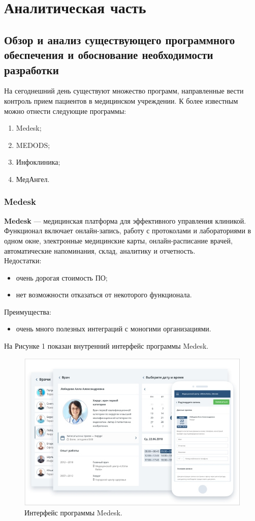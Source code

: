 \documentclass[a4paper, 10pt]{article}
\begin{document}
\clearpage
\newpage
\section{Аналитическая часть}
	\subsection{Обзор и анализ существующего программного обеспечения и обоснование необходимости разработки}
	\hspace*{5mm} На сегоднешний день существуют множество программ, направленные вести контроль прием пациентов в медицинском учреждении. К более известным можно отнести следующие программы:
	\begin{enumerate}
		\item Medesk;
		\item MEDODS;
		\item Инфоклиника;
		\item МедАнгел.
	\end{enumerate}
	\subsubsection{Medesk}
	{\bf Medesk} — медицинская платформа для эффективного управления клиникой. Функционал включает онлайн-запись, работу с протоколами и лабораториями в одном окне, электронные медицинские карты, онлайн-расписание врачей, автоматические напоминания, склад, аналитику и отчетность.
	\\Недостатки:
	\begin{itemize}
		\item очень дорогая стоимость ПО;
		\item нет возможности отказаться от некоторого функционала.
	\end{itemize}
	Преимущества:
	\begin{itemize}
		\item очень много полезных интеграций с моногими организациями.
	\end{itemize}
	На Рисунке 1 показан внутренний интерфейс программы Medesk.
	\clearpage
	\newpage
	\begin{figure}[h!]
		\centering
		\includegraphics[scale=0.7]{medecs}
		\centering\caption{Интерфейс программы Medesk.}
	\end{figure}
\end{document}
